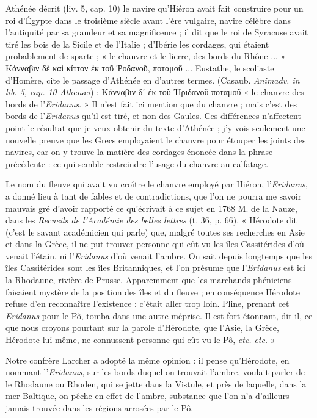 \documentclass[a4paper, 11pt, oneside, polutonikogreek, french]{article}
\begin{document}
Athénée décrit (liv. 5, cap. 10) le navire qu'Hiéron avait fait construire pour un roi d'Égypte dans le troisième siècle avant l'ère vulgaire, navire célèbre dans l'antiquité par sa grandeur et sa magnificence ; il dit que le roi de Syracuse avait tiré les bois de la Sicile et de l'Italie ; d'Ibérie les cordages, qui étaient probablement de sparte ; « le chanvre et le lierre, des bords du Rhône ... » Κάνναβιν δὲ καὶ κίττον ἐκ τοῦ Ῥοδανοῦ, ποταμοῦ ... Eustathe, le scoliaste d'Homère, cite le passage d'Athénée en d'autres termes. (Casaub. \emph{Animadv. in lib. 5, cap. 10 Athenæi}) : Κάνναβιν δ᾽ ἐκ τοῦ Ἠριδανοῦ ποταμοῦ « le chanvre des bords de l'\emph{Eridanus}. » Il n'est fait ici mention que du chanvre ; mais c'est des bords de l'\emph{Eridanus} qu'il est tiré, et non des Gaules. Ces différences n'affectent point le résultat que je veux obtenir du texte d'Athénée ; j'y vois seulement une nouvelle preuve que les Grecs employaient le chanvre pour étouper les joints des navires, car on y trouve la matière des cordages énoncée dans la phrase précédente : ce qui semble restreindre l'usage du chanvre au calfatage.

Le nom du fleuve qui avait vu croître le chanvre employé par Hiéron, l'\emph{Eridanus}, a donné lieu à tant de fables et de contradictions, que l'on ne pourra me savoir mauvais gré d'avoir rapporté ce qu'écrivait à ce sujet en 1768 M. de la Nauze, dans les \emph{Recueils de l'Académie des belles lettres} (t. 36, p. 66). « Hérodote dit (c'est le savant académicien qui parle) que, malgré toutes ses recherches en Asie et dans la Grèce, il ne put trouver personne qui eût vu les îles Cassitérides d'où venait l'étain, ni l'\emph{Eridanus} d'où venait l'ambre. On sait depuis longtemps que les îles Cassitérides sont les îles Britanniques, et l'on présume que l'\emph{Eridanus} est ici la Rhodaune, rivière de Prusse. Apparemment que les marchands phéniciens faisaient mystère de la position des îles et du fleuve ; en conséquence Hérodote refuse d'en reconnaître l'existence : c'était aller trop loin. Pline, prenant cet \emph{Eridanus} pour le Pô, tomba dans une autre méprise. Il est fort étonnant, dit-il, ce que nous croyons pourtant sur la parole d'Hérodote, que l'Asie, la Grèce, Hérodote lui-même, ne connussent personne qui eût vu le Pô, \emph{etc.} \emph{etc.} »

Notre confrère Larcher a adopté la même opinion : il pense qu'Hérodote, en nommant l'\emph{Eridanus}, sur les bords duquel on trouvait l'ambre, voulait parler de le Rhodaune ou Rhoden, qui se jette dans la Vistule, et près de laquelle, dans la mer Baltique, on pêche en effet de l'ambre, substance que l'on n'a d'ailleurs jamais trouvée dans les régions arrosées par le Pô.
\end{document}
